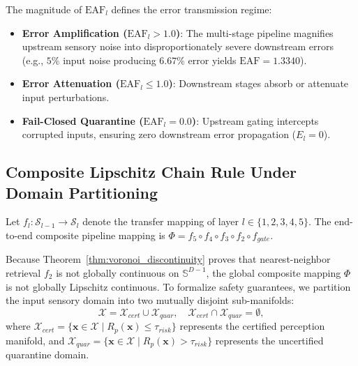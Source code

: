 \documentclass[conference]{IEEEtran}
\begin{document}
The magnitude of $\text{EAF}_l$ defines the error transmission regime:
\begin{itemize}
    \item \textbf{Error Amplification ($\text{EAF}_l > 1.0$)}: The multi-stage pipeline magnifies upstream sensory noise into disproportionately severe downstream errors (e.g., $5\%$ input noise producing $6.67\%$ error yields $\text{EAF} = 1.3340$).
    \item \textbf{Error Attenuation ($\text{EAF}_l \le 1.0$)}: Downstream stages absorb or attenuate input perturbations.
    \item \textbf{Fail-Closed Quarantine ($\text{EAF}_l = 0.0$)}: Upstream gating intercepts corrupted inputs, ensuring zero downstream error propagation ($E_l = 0$).
\end{itemize}

\subsection{Composite Lipschitz Chain Rule Under Domain Partitioning}
Let $f_l: \mathcal{S}_{l-1} \to \mathcal{S}_l$ denote the transfer mapping of layer $l \in \{1, 2, 3, 4, 5\}$. The end-to-end composite pipeline mapping is $\Phi = f_5 \circ f_4 \circ f_3 \circ f_2 \circ f_{gate}$.

Because Theorem~\ref{thm:voronoi_discontinuity} proves that nearest-neighbor retrieval $f_2$ is not globally continuous on $\mathbb{S}^{D-1}$, the global composite mapping $\Phi$ is not globally Lipschitz continuous. To formalize safety guarantees, we partition the input sensory domain into two mutually disjoint sub-manifolds:
\begin{equation}
\mathcal{X} = \mathcal{X}_{cert} \cup \mathcal{X}_{quar}, \quad \mathcal{X}_{cert} \cap \mathcal{X}_{quar} = \emptyset,
\end{equation}
where $\mathcal{X}_{cert} = \{ \mathbf{x} \in \mathcal{X} \mid R_p(\mathbf{x}) \le \tau_{risk} \}$ represents the certified perception manifold, and $\mathcal{X}_{quar} = \{ \mathbf{x} \in \mathcal{X} \mid R_p(\mathbf{x}) > \tau_{risk} \}$ represents the uncertified quarantine domain.
\end{document}
